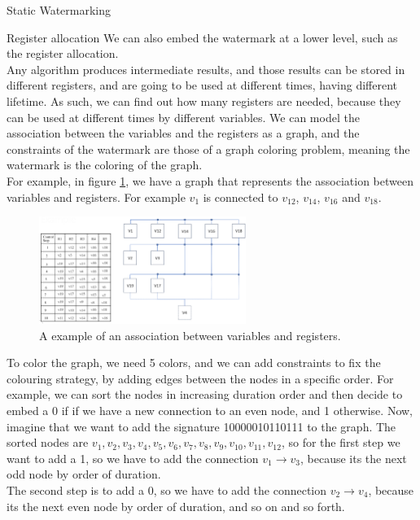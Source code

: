 \begin{section}{Static Watermarking}
  \begin{subsection}{Register allocation}
    We can also embed the watermark at a lower level, such as the register allocation.\\
    Any algorithm produces intermediate results, and those results can be stored in different registers,
    and are going to be used at different times, having different lifetime. As such, we can find out how
    many registers are needed, because they can be used at different times by different variables.
    We can model the association between the variables and the registers as a graph, and the constraints
    of the watermark are those of a graph coloring problem, meaning the watermark is the coloring of the graph.\\
    For example, in figure \ref{fig:graphcoloring}, we have a graph that represents the association between
    variables and registers. For example $v_1$ is connected to $v_{12}$, $v_{14}$, $v_{16}$ and $v_{18}$.
    \begin{figure}[H]
      \centering
      \includegraphics[width=0.6\textwidth]{img/hardware/register allocation.png}
      \caption{A example of an association between variables and registers.}
      \label{fig:graphcoloring}
    \end{figure}
    To color the graph, we need 5 colors, and we can add constraints to fix the colouring strategy,
    by adding edges between the nodes in a specific order.
    For example, we can sort the nodes in increasing duration order and then decide to embed a 0 if 
    if we have a new connection to an even node, and 1 otherwise.
    Now, imagine that we want to add the signature 10000010110111 to the graph. 
    The sorted nodes are $v_1,v_2,v_3,v_4,v_5,v_6,v_7,v_8,v_9,v_{10},v_{11},v_{12}$, so for the first step 
    we want to add a 1, so we have to add the connection $v_1\to v_3$, because its the next odd node by 
    order of duration.\\
    The second step is to add a 0, so we have to add the connection $v_2\to v_4$, because its the next
    even node by order of duration, and so on and so forth.\\ 

\end{subsection}
\end{section}
